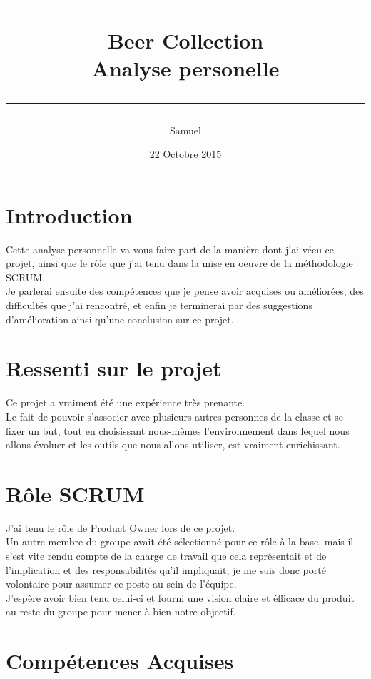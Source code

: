 \documentclass{report}
\title{
\parbox{15cm}
{ %
  \vspace{3cm}
	\begin{center}\sf\bfseries\Huge
		\rule{15cm}{1pt}
		\medskip
		Beer Collection \\
		\huge Analyse personelle\\
		\vspace{.5cm}
		\rule{15cm}{1pt}
	\end{center}
	\vspace{3cm}
 }}
\author{Samuel \bsc{Monroe}}
\date{22 Octobre 2015}
\begin{document}
\maketitle

\newpage
\thispagestyle{empty}
\mbox{}

\section{Introduction}

	Cette analyse personnelle va vous faire part de la manière dont j'ai vécu ce projet, ainsi que le rôle que j'ai tenu dans la mise en oeuvre de la méthodologie SCRUM.\\
	Je parlerai ensuite des compétences que je pense avoir acquises ou améliorées, des difficultés que j'ai rencontré, et enfin je terminerai par des suggestions d'amélioration ainsi qu'une conclusion sur ce projet.\\

\section{Ressenti sur le projet}
	
	Ce projet a vraiment été une expérience très prenante.\\
	Le fait de pouvoir s'associer avec plusieurs autres personnes de la classe et se fixer un but, tout en choisissant nous-mêmes l'environnement dans lequel nous allons évoluer et les outils que nous allons utiliser, est vraiment enrichissant.\\

\section{Rôle SCRUM}

	J'ai tenu le rôle de Product Owner lors de ce projet.\\
	Un autre membre du groupe avait été sélectionné pour ce rôle à la base, mais il s'est vite rendu compte de la charge de travail que cela représentait et de l'implication et des responsabilités qu'il impliquait, je me suis donc porté volontaire pour assumer ce poste au sein de l'équipe.\\

	J'espère avoir bien tenu celui-ci et fourni une vision claire et éfficace du produit au reste du groupe pour mener à bien notre objectif.\\

\section{Compétences Acquises}
\end{document}
